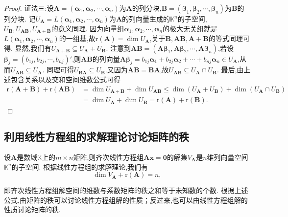\documentclass[lang=cn,newtx,10pt,scheme=chinese]{elegantbook}
\begin{document}
\begin{proof}
{\color{blue}证法三:}设\(\boldsymbol{A}=(\boldsymbol{\alpha}_1,\boldsymbol{\alpha}_2,\cdots,\boldsymbol{\alpha}_n)\)为\(\boldsymbol{A}\)的列分块,\(\boldsymbol{B}=(\boldsymbol{\beta}_1,\boldsymbol{\beta}_2,\cdots,\boldsymbol{\beta}_n)\)为\(\boldsymbol{B}\)的列分块. 记\(U_{\boldsymbol{A}} = L(\boldsymbol{\alpha}_1,\boldsymbol{\alpha}_2,\cdots,\boldsymbol{\alpha}_n)\)为\(\boldsymbol{A}\)的列向量生成的\(\mathbb{K}^n\)的子空间,\(U_{\boldsymbol{B}},U_{\boldsymbol{A}\boldsymbol{B}},U_{\boldsymbol{A}+\boldsymbol{B}}\)的意义同理. 因为向量组\(\boldsymbol{\alpha}_1,\boldsymbol{\alpha}_2,\cdots,\boldsymbol{\alpha}_n\)的极大无关组就是\(L(\boldsymbol{\alpha}_1,\boldsymbol{\alpha}_2,\cdots,\boldsymbol{\alpha}_n)\)的一组基,故\(\mathrm{r}(\boldsymbol{A})=\dim U_{\boldsymbol{A}}\),关于\(\boldsymbol{B},\boldsymbol{A}\boldsymbol{B},\boldsymbol{A}+\boldsymbol{B}\)的等式同理可得. 显然,我们有\(U_{\boldsymbol{A}+\boldsymbol{B}}\subseteq U_{\boldsymbol{A}}+U_{\boldsymbol{B}}\). 注意到\(\boldsymbol{A}\boldsymbol{B}=(\boldsymbol{A}\boldsymbol{\beta}_1,\boldsymbol{A}\boldsymbol{\beta}_2,\cdots,\boldsymbol{A}\boldsymbol{\beta}_n)\),若设\(\boldsymbol{\beta}_j=(b_{1j},b_{2j},\cdots,b_{nj})'\),则\(\boldsymbol{A}\boldsymbol{B}\)的列向量\(\boldsymbol{A}\boldsymbol{\beta}_j=b_{1j}\boldsymbol{\alpha}_1 + b_{2j}\boldsymbol{\alpha}_2+\cdots + b_{nj}\boldsymbol{\alpha}_n\in U_{\boldsymbol{A}}\),从而\(U_{\boldsymbol{A}\boldsymbol{B}}\subseteq U_{\boldsymbol{A}}\). 同理可得\(U_{\boldsymbol{B}\boldsymbol{A}}\subseteq U_{\boldsymbol{B}}\).又因为\(\boldsymbol{A}\boldsymbol{B}=\boldsymbol{B}\boldsymbol{A}\),故\(U_{\boldsymbol{A}\boldsymbol{B}}\subseteq U_{\boldsymbol{A}}\cap U_{\boldsymbol{B}}\). 最后,由上述包含关系以及交和空间维数公式可得
\begin{align*}
\mathrm{r}(\boldsymbol{A}+\boldsymbol{B})+\mathrm{r}(\boldsymbol{A}\boldsymbol{B})&=\dim U_{\boldsymbol{A}+\boldsymbol{B}}+\dim U_{\boldsymbol{A}\boldsymbol{B}}\leq\dim(U_{\boldsymbol{A}}+U_{\boldsymbol{B}})+\dim(U_{\boldsymbol{A}}\cap U_{\boldsymbol{B}})\\
&=\dim U_{\boldsymbol{A}}+\dim U_{\boldsymbol{B}}=\mathrm{r}(\boldsymbol{A})+\mathrm{r}(\boldsymbol{B}).
\end{align*}
\end{proof}

\subsection{利用线性方程组的求解理论讨论矩阵的秩}

\begin{theorem}\label{theorem:系数矩阵的秩与解空间的维数}
设\(\boldsymbol{A}\)是数域\(\mathbb{K}\)上的\(m\times n\)矩阵,则齐次线性方程组\(\boldsymbol{A}\boldsymbol{x}=\boldsymbol{0}\)的解集\(V_{\boldsymbol{A}}\)是\(n\)维列向量空间\(\mathbb{K}^n\)的子空间. 根据线性方程组的求解理论,我们有
\[
\dim V_{\boldsymbol{A}}+\mathrm{r}(\boldsymbol{A}) = n,
\]
\end{theorem}
\begin{note}
即齐次线性方程组解空间的维数与系数矩阵的秩之和等于未知数的个数. 根据上述公式,由矩阵的秩可以讨论线性方程组解的性质；反过来,也可以由线性方程组解的性质讨论矩阵的秩. 
\end{note}
\end{document}
